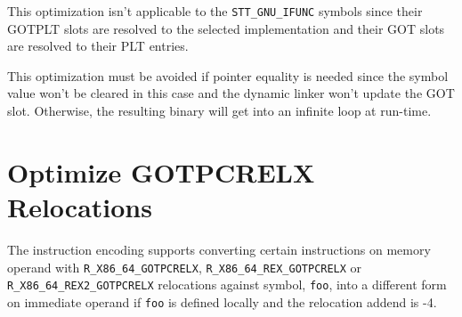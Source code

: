 This optimization isn't applicable to the \texttt{STT_GNU_IFUNC} symbols
since their GOTPLT slots are resolved to the selected implementation and
their GOT slots are resolved to their PLT entries.

This optimization must be avoided if pointer equality is needed since
the symbol value won't be cleared in this case and the dynamic linker
won't update the GOT slot.  Otherwise, the resulting binary will get
into an infinite loop at run-time.

\section{Optimize GOTPCRELX Relocations}
\label{opt_gotpcrelx}

The \xARCH instruction encoding supports converting certain instructions
on memory operand with \texttt{R_X86_64_GOTPCRELX},
\texttt{R_X86_64_REX_GOTPCRELX} or \texttt{R_X86_64_REX2_GOTPCRELX}
relocations against symbol, \texttt{foo},
into a different form on immediate operand if \texttt{foo} is defined
locally and the relocation addend is -4.

